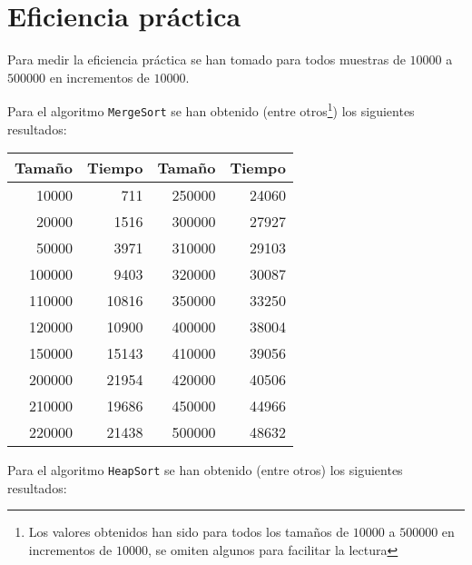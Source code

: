 \pagebreak

\section{Eficiencia práctica}\label{eficiencia-practica}

Para medir la eficiencia práctica se han tomado para todos muestras de $10000$ a $500000$ en incrementos de $10000$.

Para el algoritmo \texttt{MergeSort} se han obtenido (entre otros\footnote{Los valores obtenidos han sido para todos los tamaños de $10000$ a $500000$ en incrementos de $10000$, se omiten algunos para facilitar la lectura}) los siguientes resultados:

\begin{center}
\begin{tabular}{r r || r r}
\textbf{Tamaño} & \textbf{Tiempo} & \textbf{Tamaño} & \textbf{Tiempo} \\
\toprule
10000           & 711             & 250000          & 24060           \\
20000           & 1516            & 300000          & 27927           \\
50000           & 3971            & 310000          & 29103           \\
100000          & 9403            & 320000          & 30087           \\
110000          & 10816           & 350000          & 33250           \\
120000          & 10900           & 400000          & 38004           \\
150000          & 15143           & 410000          & 39056           \\
200000          & 21954           & 420000          & 40506           \\
210000          & 19686           & 450000          & 44966           \\
220000          & 21438           & 500000          & 48632           \\
\end{tabular}
\end{center}

Para el algoritmo \texttt{HeapSort} se han obtenido (entre otros) los siguientes resultados:

